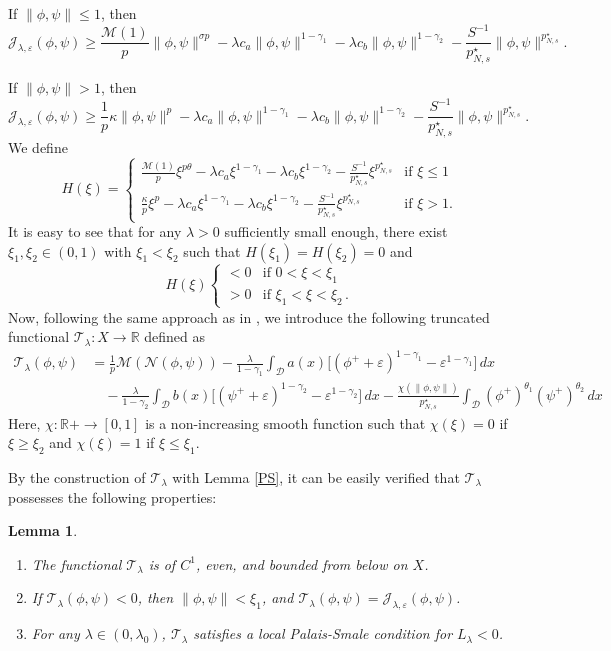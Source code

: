 \documentclass[10pt,a4paper]{amsart}
\numberwithin{equation}{section}
\newtheorem{lemma}[theo]{Lemma}
\begin{document}
If $\| \phi,\psi \|\leq 1$, then
$$\mathcal{J}_{\lambda,\varepsilon}(\phi,\psi)\geq \frac{\mathscr{M}(1)}{p}\| \phi,\psi \|^{\sigma p}- \lambda c_a\| \phi,\psi\|^{1-\gamma_1}-\lambda c_b\| \phi,\psi\|^{1-\gamma_2}-\frac{S^{-1}}{p^\star_{N,s}}\| \phi,\psi\|^{p^\star_{N,s}}.$$

If $\| \phi,\psi \|> 1$, then
$$
\mathcal{J}_{\lambda,\varepsilon}(\phi,\psi)\geq \frac{1}{p}\kappa\| \phi,\psi\|^p
- \lambda c_a\| \phi,\psi\|^{1-\gamma_1}-\lambda c_b\| \phi,\psi\|^{1-\gamma_2}
-\frac{S^{-1}}{p^\star_{N,s}}\| \phi,\psi\|^{p^\star_{N,s}}.
$$
We define
\[
H(\xi)=
\begin{cases}
\frac{\mathscr{M}(1)}{p}\xi^{p\theta}-\lambda c_a\xi^{1-\gamma_1}
 -\lambda c_b\xi^{1-\gamma_2}-\frac{S^{-1}}{p^\star_{N,s}}\xi^{p^\star_{N,s}} 
 & \text{if } \xi\leq 1\\[4pt]
\frac{\kappa}{p} \xi^p-\lambda c_a\xi^{1-\gamma_1}-\lambda c_b\xi^{1-\gamma_2}
-\frac{S^{-1}}{p^\star_{N,s}}\xi^{p^\star_{N,s}}& \text{if } \xi> 1.
\end{cases}
\]
It is easy to see that for any $\lambda>0$ sufficiently small enough, there exist 
$\xi_1,\xi_2\in (0,1)$ with $\xi_1<\xi_2$ such that $H(\xi_1)=H(\xi_2)=0$ and
\[
H(\xi) \begin{cases}
<0 & \text{if } 0<\xi<\xi_1\\
>0 & \text{if } \xi_1<\xi<\xi_2\,.
\end{cases}
\]
Now, following the same approach as in \cite{t9}, we introduce the following truncated 
functional $\mathcal{T}_\lambda:X\to \mathbb{R}$ defined as
\begin{align*}
\mathcal{T}_\lambda(\phi,\psi)
&=\frac{1}{p}\mathscr{M}(\mathcal{N}(\phi,\psi))
 -\frac{\lambda}{1-\gamma_1}\int_\mathcal{D} a(x)\Big[(\phi^++\varepsilon)^{1-\gamma_1}
 -\varepsilon^{1-\gamma_1}\Big]\,dx\\
&\quad -\frac{\lambda}{1-\gamma_2}\int_\mathcal{D} b(x)\Big[(\psi^+
 +\varepsilon)^{1-\gamma_2}-\varepsilon^{1-\gamma_2}\Big]\,dx
 -\frac{\chi(\| \phi,\psi\|)}{p^\star_{N,s}}\int_\mathcal{D} 
  (\phi^+)^{\theta_1}(\psi^+)^{\theta_2}\,dx
\end{align*}
Here, $\chi:\mathbb{R}+\to [0,1]$ is a non-increasing smooth function such that
$\chi(\xi)=0$ if $\xi\geq \xi_2$ and $\chi(\xi)=1$ if $\xi\leq \xi_1$.

By the construction of $\mathcal{T}_\lambda$ with Lemma \ref{PS}, it can be easily 
verified that $\mathcal{T}_\lambda$ possesses the following properties:
\begin{lemma}\label{L1}
\begin{enumerate}
\item The functional $\mathcal{T}_\lambda$ is of $C^1$, even, and bounded from below 
on $X$.

\item If $\mathcal{T}_\lambda(\phi,\psi)< 0$, then $\| \phi,\psi\|< \xi_1$, and 
$\mathcal{T}_\lambda(\phi,\psi)=\mathcal{J}_{\lambda,\varepsilon}(\phi,\psi)$.

\item For any $\lambda\in (0,\lambda_0)$, $\mathcal{T}_\lambda$ satisfies a local 
Palais-Smale condition for $L_\lambda<0$.
\end{enumerate}
\end{lemma}
\end{document}
